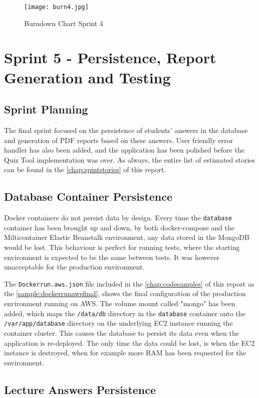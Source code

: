 \begin{figure}[h!]
    \centering
    \texttt{[image: burn4.jpg]}
    \caption{Burndown Chart Sprint 4}
    \label{fig:burn4}
\end{figure}

\section{Sprint 5 - Persistence, Report Generation and Testing}
\subsection{Sprint Planning}
The final sprint focused on the persistence of students' answers in the database and
generation of PDF reports based on these answers. User friendly error handler has
also been added, and the application has been polished before the Quiz Tool implementation
was over. As always, the entire list of estimated stories
can be found in the \autoref{chap:spintstories} of this report.

\subsection{Database Container Persistence}
Docker containers do not persist data by design. Every time the \texttt{database}
container has been brought up and down, by both docker-compose and the
Milticontainer Elastic Beanstalk environment, any data stored in the MongoDB
would be lost. This behaviour is perfect for running tests, where the starting
environment is expected to be the same between tests. It was however unacceptable
for the production environment.

The \texttt{Dockerrun.aws.json} file included in the \autoref{chap:codesamples} of this report
as the \autoref{sample:dockerrunawsfinal}, shows the final configuration of the production
environment running on AWS. The volume mount called "mongo" has been added, which maps the
\texttt{/data/db} directory in the \texttt{database} container onto the \texttt{/var/app/database}
directory on the underlying EC2 instance running the container cluster. This causes the database
to persist its data even when the application is re-deployed. The only time the data could
be lost, is when the EC2 instance is destroyed, when for example more RAM has been requested
for the environment.

\subsection{Lecture Answers Persistence}

